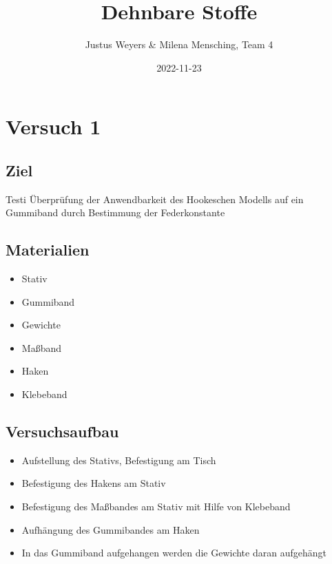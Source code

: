 \documentclass[class=article, crop=false]{standalone}
\title{Dehnbare Stoffe}
\author{Justus Weyers \& Milena Mensching, Team 4}
\date{2022-11-23}
\providecommand{\tightlist}{%
  \setlength{\itemsep}{0pt}\setlength{\parskip}{0pt}}
\begin{document}
\hypertarget{versuch-1}{%
\section{Versuch 1}\label{versuch-1}}

\hypertarget{ziel}{%
\subsection{Ziel}\label{ziel}}

Testi Überprüfung der Anwendbarkeit des Hookeschen Modells auf ein
Gummiband durch Bestimmung der Federkonstante

\hypertarget{materialien}{%
\subsection{Materialien}\label{materialien}}

\begin{itemize}
\tightlist
\item
  Stativ
\item
  Gummiband
\item
  Gewichte
\item
  Maßband
\item
  Haken
\item
  Klebeband
\end{itemize}

\hypertarget{versuchsaufbau}{%
\subsection{Versuchsaufbau}\label{versuchsaufbau}}

\begin{itemize}
\tightlist
\item
  Aufstellung des Stativs, Befestigung am Tisch
\item
  Befestigung des Hakens am Stativ
\item
  Befestigung des Maßbandes am Stativ mit Hilfe von Klebeband
\item
  Aufhängung des Gummibandes am Haken
\item
  In das Gummiband aufgehangen werden die Gewichte daran aufgehängt
\end{itemize}
\end{document}
